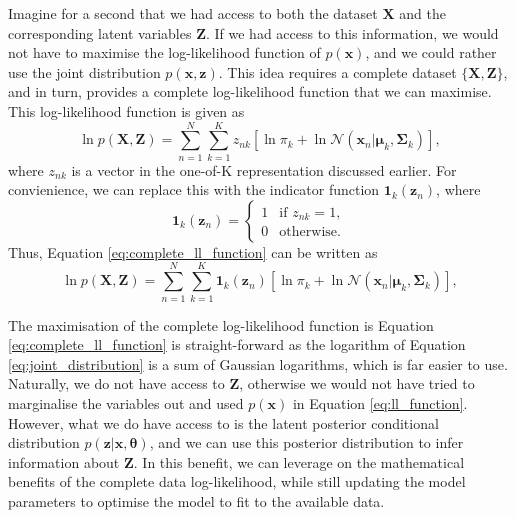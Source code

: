 \documentclass{article}
\begin{document}
Imagine for a second that we had access to both the dataset $\mathbf{X}$ and the corresponding latent variables $\mathbf{Z}$. If we had access to this information, we would not have to maximise the log-likelihood function of $p(\mathbf{x})$, and we could rather use the joint distribution $p(\mathbf{x}, \mathbf{z})$. This idea requires a complete dataset $\{\mathbf{X}, \mathbf{Z}\}$, and in turn, provides a complete log-likelihood function that we can maximise. This log-likelihood function is given as
\begin{equation}\label{eq:complete_ll_function}
\ln p(\mathbf{X}, \mathbf{Z}) = \sum_{n=1}^{N} \sum_{k=1}^{K} z_{nk}\left[\ln \pi_k + \ln \mathcal{N}(\mathbf{x}_n \vert \boldsymbol\mu_k, \boldsymbol\Sigma_k) \right],
\end{equation}
where $z_{nk}$ is a vector in the one-of-K representation discussed earlier. For convienience, we can replace this with the indicator function $\mathbf{1}_k(\mathbf{z}_n)$, where
\begin{equation}
\mathbf{1}_k(\mathbf{z}_n) = 
\begin{cases} 
1 & \text{if } z_{nk} = 1, \\
0 & \text{otherwise.}
\end{cases}
\end{equation}
Thus, Equation \eqref{eq:complete_ll_function} can be written as
\begin{equation}\label{eq:complete_ll_function_updated}
\ln p(\mathbf{X}, \mathbf{Z}) = \sum_{n=1}^{N} \sum_{k=1}^{K} \mathbf{1}_k(\mathbf{z}_n) \left[ \ln \pi_k + \ln \mathcal{N}(\mathbf{x}_n \vert \boldsymbol\mu_k, \boldsymbol\Sigma_k) \right],
\end{equation}

 The maximisation of the complete log-likelihood function is Equation \eqref{eq:complete_ll_function} is straight-forward as the logarithm of Equation \eqref{eq:joint_distribution} is a sum of Gaussian logarithms, which is far easier to use. Naturally, we do not have access to $\mathbf{Z}$, otherwise we would not have tried to marginalise the variables out and used $p(\mathbf{x})$ in Equation \eqref{eq:ll_function}. However, what we do have access to is the latent posterior conditional distribution $p(\mathbf{z}\vert\mathbf{x}, \boldsymbol\theta)$, and we can use this posterior distribution to infer information about $\mathbf{Z}$. In this benefit, we can leverage on the mathematical benefits of the complete data log-likelihood, while still updating the model parameters to optimise the model to fit to the available data.
\end{document}
